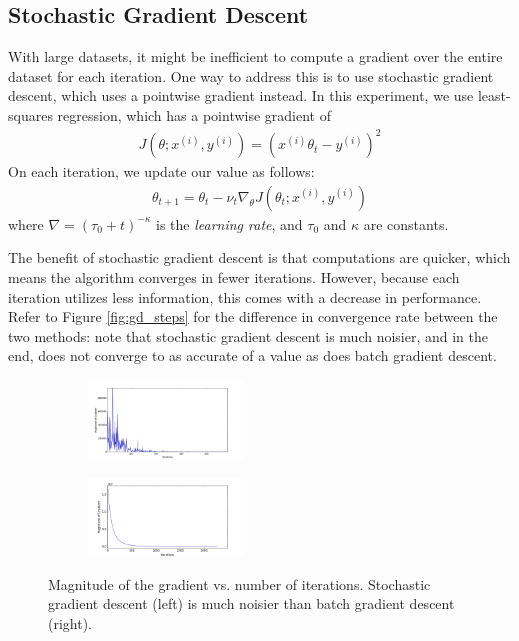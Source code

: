 \documentclass[10pt]{paper}
\begin{document}
\subsection{Stochastic Gradient Descent}

With large datasets, it might be inefficient to compute a gradient over the entire dataset for each iteration. One way to address this is to use stochastic gradient descent, which uses a pointwise gradient instead. In this experiment, we use least-squares regression, which has a pointwise gradient of 
\begin{align*}
J(\theta; x^{(i)}, y^{(i)}) = (x^{(i)}\theta_t - y^{(i)})^2
\end{align*}
On each iteration, we update our value as follows:
\begin{align*}
\theta_{t+1} = \theta_{t} - \nu_t \nabla_\theta J(\theta_t; x^{(i)}, y^{(i)})
\end{align*}
where $\nabla = (\tau_0 + t)^{-\kappa}$ is the \emph{learning rate}, and $\tau_0$ and $\kappa$ are constants.

The benefit of stochastic gradient descent is that computations are quicker, which means the algorithm converges in fewer iterations. However, because each iteration utilizes less information, this comes with a decrease in performance. Refer to Figure \ref{fig:gd_steps} for the difference in convergence rate between the two methods: note that stochastic gradient descent is much noisier, and in the end, does not converge to as accurate of a value as does batch gradient descent.

\begin{figure}[ht!]
  \center
  \label{fig:gd_steps}
  \begin{subfigure}
    \centering
      \includegraphics[width=0.45\textwidth]{../images/stochastic_gradient_steps}
  \end{subfigure}
  \begin{subfigure}
    \centering
      \includegraphics[width=0.45\textwidth]{../images/batch_gradient_steps_2}
  \end{subfigure}
  \caption{Magnitude of the gradient vs. number of iterations. Stochastic gradient descent (left) is much noisier than batch gradient descent (right).}
\end{figure}
\end{document}
